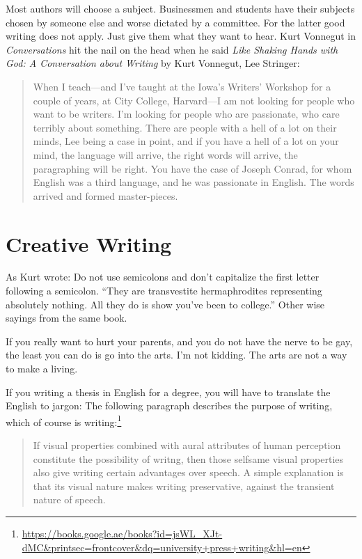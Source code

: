 Most authors will choose a subject. Businessmen and students have their subjects chosen by someone else and worse dictated by a committee. For the latter good writing does not apply. Just give them what they want to hear.
Kurt Vonnegut in \emph{Conversations} hit the nail on the head when he said \emph{Like Shaking Hands with God: A Conversation about Writing} by Kurt Vonnegut, Lee Stringer:


\begin{quotation}
When I teach---and I’ve taught at the Iowa’s Writers’ Workshop for a couple of years, at City College, Harvard---I am not looking for people who want to be writers. I’m looking for people who are passionate, who care terribly about something. There are people with a hell of a lot on their minds, Lee being a case in point, and if you have a hell of a lot on your mind, the language will arrive, the right words will arrive, the paragraphing will be right. You have the case of Joseph Conrad, for whom English was a third language, and he was passionate in English. The words arrived and formed master-pieces.
\end{quotation}

\chapter{Creative Writing}

As Kurt wrote: Do not use semicolons and don’t capitalize the first letter following a semicolon. “They are transvestite hermaphrodites representing absolutely nothing. All they do is show you’ve been to college.”
Other wise sayings from the same book.

If you really want to hurt your parents, and you do not have the nerve to be gay, the least you can do is go into the arts. I’m not kidding. The arts are not a way to make a living. 

If you writing a thesis in English for a degree, you will have to translate the English to jargon: The following paragraph describes the purpose of writing, which of course is writing:\footnote{\protect
\url{https://books.google.ae/books?id=jsWL_XJt-dMC&printsec=frontcover&dq=university+press+writing&hl=en}}

\begin{quotation}
If visual properties combined with aural attributes of human perception constitute the possibility of writng, then those selfsame visual properties also give writing certain advantages over speech. A simple explanation is that its visual nature makes writing preservative, against the transient nature of speech. 
\end{quotation}

